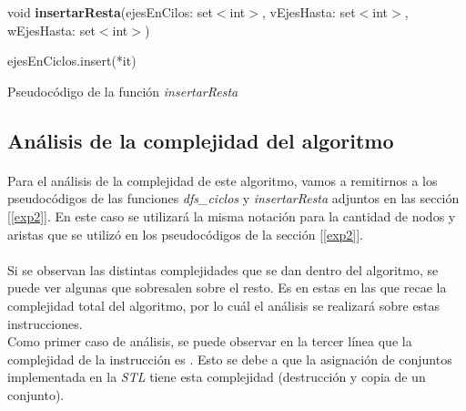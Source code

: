 \vspace{11pt}

\incmargin{1em}
\linesnumbered
{}

void \textbf{insertarResta}(ejesEnCilos: set$<$int$>$, vEjesHasta: set$<$int$>$, wEjesHasta: set$<$int$>$) \\
\begin{algorithm}[H]
	\BlankLine
	 {
		 {ejesEnCiclos.insert(*it)}
	}
	
	\caption{Pseudocódigo de la función \textit{insertarResta}}
\end{algorithm}


\subsection{Análisis de la complejidad del algoritmo}
\label{complejidad2}

\paragraph{}
Para el análisis de la complejidad de este algoritmo, vamos a remitirnos a los pseudocódigos de las funciones \textit{dfs\_ciclos} y \textit{insertarResta} adjuntos en las sección [\ref{exp2}]. En este caso se utilizará la misma notación para la cantidad de nodos y aristas que se utilizó en los pseudocódigos de la sección [\ref{exp2}].

\paragraph{}
Si se observan las distintas complejidades que se dan dentro del algoritmo, se puede ver algunas que sobresalen sobre el resto. Es en estas en las que recae la complejidad total del algoritmo, por lo cuál el análisis se realizará sobre estas instrucciones.\\
Como primer caso de análisis, se puede observar en la tercer línea que la complejidad de la instrucción es . Esto se debe a que la asignación de conjuntos implementada en la \textit{STL} tiene esta complejidad (destrucción y copia de un conjunto).

